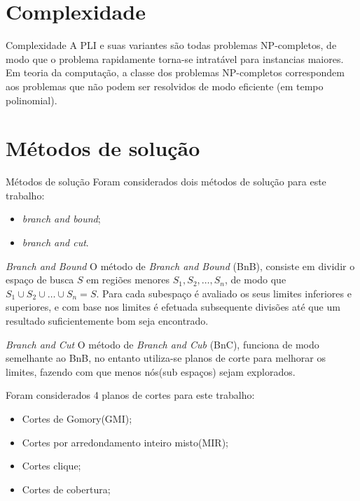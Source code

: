 \documentclass{beamer}
\begin{document}
\section{Complexidade}
\begin{frame}[c]{Complexidade}
    A PLI e suas variantes são todas problemas NP-completos, de modo que o problema rapidamente torna-se
    intratável para instancias maiores. Em teoria da computação, a classe dos problemas NP-completos correspondem
    aos problemas que não podem ser resolvidos de modo eficiente (em tempo polinomial).
\end{frame}

\section{Métodos de solução}
\begin{frame}[c]{Métodos de solução}
    Foram considerados dois métodos de solução para este trabalho:
    \begin{itemize}
        \item \textit{branch and bound};
        \item \textit{branch and cut}.
    \end{itemize}
\end{frame}

\begin{frame}[c]{\textit{Branch and Bound}}
    O método de \textit{Branch and Bound} (BnB), consiste em dividir o espaço de busca $S$ em regiões menores $S_1, S_2, \ldots, S_n$, de modo
     que $S_1 \cup S_2 \cup \ldots \cup S_n = S$. Para cada subespaço é avaliado os seus limites inferiores e superiores, e com base
     nos limites é efetuada subsequente divisões até que um resultado suficientemente bom seja encontrado.
\end{frame}

\begin{frame}[c]{\textit{Branch and Cut}}
    O método de \textit{Branch and Cub} (BnC), funciona de modo semelhante ao BnB, no entanto utiliza-se planos de corte
    para melhorar os limites, fazendo com que menos nós(sub espaços) sejam explorados.

    Foram considerados 4 planos de cortes para este trabalho:
    \begin{itemize}
        \item Cortes de Gomory(GMI);
        \item Cortes por arredondamento inteiro misto(MIR);
        \item Cortes clique;
        \item Cortes de cobertura;
    \end{itemize}
\end{frame}
\end{document}
